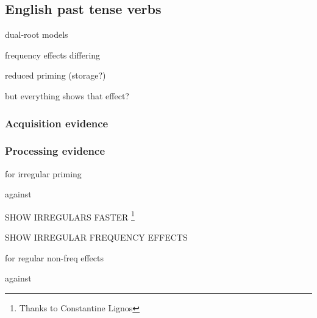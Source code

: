 \subsection{English past tense verbs}

dual-root models \citet{Baayen1997b}

frequency effects differing

reduced priming (storage?)
\citet{Stanners1979}
\citet{Marslen-Wilson1993}

\citet{ODonnell2011a}
\citet{ODonnell2011b}

but everything shows that effect?

\citet{Alegre1999}
\citet{Gordon1999}

\subsubsection{Acquisition evidence}

\citet{Gorman2011f}

\citet{Prasada1993}
\citet{Albright2003b}

\subsubsection{Processing evidence}

for irregular priming
\citet{Emmorey1989}
\citet{Allen2002}
\citet{Stockall2006}

against
\citet{Stanners1979}
\citet{Marslen-Wilson1993}

\citet{ELP}

SHOW IRREGULARS FASTER
\footnote{Thanks to Constantine Lignos}

SHOW IRREGULAR FREQUENCY EFFECTS

for regular non-freq effects
\citet{Lignos2011}

against
\citet{Alegre1999}
\citet{Gordon1999}
\citet{Baayen2008b}
